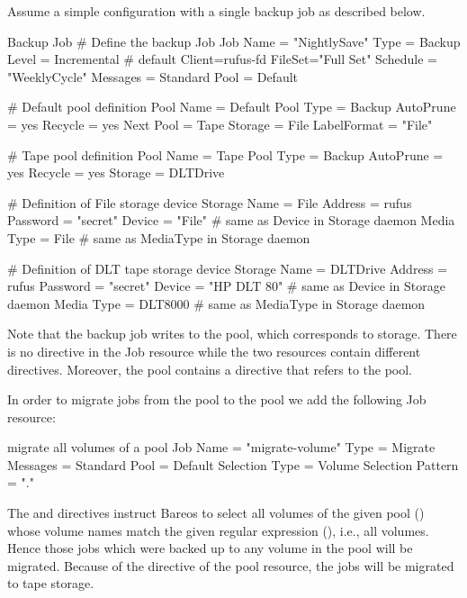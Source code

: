 Assume a simple configuration with a single backup job as described
below.

\begin{bconfig}{Backup Job}
# Define the backup Job
Job {
  Name = "NightlySave"
  Type = Backup
  Level = Incremental                 # default
  Client=rufus-fd
  FileSet="Full Set"
  Schedule = "WeeklyCycle"
  Messages = Standard
  Pool = Default
}

# Default pool definition
Pool {
  Name = Default
  Pool Type = Backup
  AutoPrune = yes
  Recycle = yes
  Next Pool = Tape
  Storage = File
  LabelFormat = "File"
}

# Tape pool definition
Pool {
  Name = Tape
  Pool Type = Backup
  AutoPrune = yes
  Recycle = yes
  Storage = DLTDrive
}

# Definition of File storage device
Storage {
  Name = File
  Address = rufus
  Password = "secret"
  Device = "File"          # same as Device in Storage daemon
  Media Type = File        # same as MediaType in Storage daemon
}

# Definition of DLT tape storage device
Storage {
  Name = DLTDrive
  Address = rufus
  Password = "secret"
  Device = "HP DLT 80"      # same as Device in Storage daemon
  Media Type = DLT8000      # same as MediaType in Storage daemon
}
\end{bconfig}

Note that the backup job writes to the  pool, which
corresponds to  storage. There is no
 directive
in the Job resource while the two  resources contain
different  directives.
Moreover, the 
pool contains a  directive
that refers to the  pool.

In order to migrate jobs from the  pool to the  pool
we add the following Job resource:

\begin{bconfig}{migrate all volumes of a pool}
Job {
  Name = "migrate-volume"
  Type = Migrate
  Messages = Standard
  Pool = Default
  Selection Type = Volume
  Selection Pattern = "."
}
\end{bconfig}

The  and
 directives
instruct Bareos to select all volumes of the given pool ()
whose volume names match the given regular expression (),
i.e., all volumes. Hence those jobs which were backed up to any volume
in the  pool will be migrated. Because of the
 directive
of the  pool resource, the jobs will be
migrated to tape storage.

